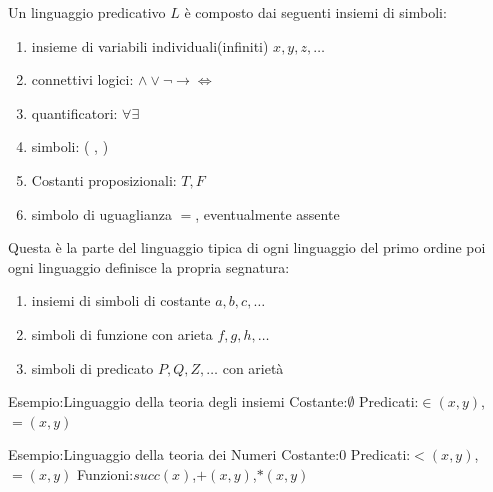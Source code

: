 Un linguaggio predicativo $L$ è composto dai seguenti insiemi di simboli:
\begin{enumerate}
    \item insieme di variabili individuali(infiniti) $x,y,z,\dots$
    \item connettivi logici: $\land \lor \neg \rightarrow \iff$
    \item quantificatori: $\forall \exists$
    \item simboli: ( , )
    \item Costanti proposizionali: $T,F$
    \item simbolo di uguaglianza $=$, eventualmente assente
\end{enumerate}
Questa è la parte del linguaggio tipica di ogni linguaggio del primo ordine poi ogni linguaggio definisce la propria segnatura:
\begin{enumerate}
    \item insiemi di simboli di costante $a,b,c,\dots$
    \item simboli di funzione con arieta $f,g,h,\dots$
    \item simboli di predicato $P,Q,Z,\dots$ con arietà
\end{enumerate}

Esempio:Linguaggio della teoria degli insiemi \newline
Costante:$\emptyset$\newline
Predicati:$\in(x,y)$, $=(x,y)$

Esempio:Linguaggio della teoria dei Numeri \newline
Costante:$0$ \newline
Predicati:$<(x,y)$,$=(x,y)$ \newline
Funzioni:$succ(x)$,$+(x,y)$,$*(x,y)$

